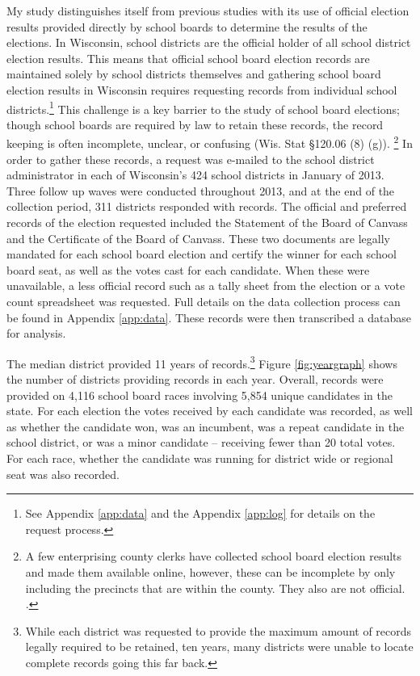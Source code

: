 My study distinguishes itself from previous studies with 
its use of official election results provided directly by school boards to determine 
the results of the elections. In Wisconsin, school districts are the official holder of all school district election results. This means that official school board election records are maintained solely by 
school districts themselves and gathering school board election results in Wisconsin 
requires requesting records from individual school districts.\footnote{See Appendix 
\ref{app:data} and the Appendix \ref{app:log} for details on the request process.} 
This challenge is a key barrier to the study of school board elections; though 
school boards are required by law to retain these records, the record keeping is 
often incomplete, unclear, or confusing (Wis. Stat \S 120.06 (8) (g)).
\footnote{A few enterprising county clerks have collected school board election 
results and made them available online, however, these can be incomplete 
by only including the precincts that are within the county. They also are not official. 
\citep[personal communication with][]{clerk1}.} In order to gather these records, a 
request was e-mailed to the school district administrator in each of Wisconsin's 
424 school districts in January of 2013. Three follow up waves were conducted throughout 
2013, and at the end of the collection period, 311 
districts responded with records. The official and preferred 
records of the election requested included the Statement of the Board of Canvass 
and the Certificate of the Board of Canvass. These two documents are legally mandated 
for each school board election and certify the winner for each school board seat, 
as well as the votes cast for each candidate. When these were unavailable, a less 
official record such as a tally sheet from the election or a vote count spreadsheet 
was requested. Full details on the data collection process can be found in Appendix \ref{app:data}. 
These records were then transcribed a database for analysis.

The median district provided 
11 
years of records.\footnote{While each district was requested to provide the maximum amount of records legally required to be retained, ten years, many districts were unable to locate complete 
records going this far back.} Figure \ref{fig:yeargraph} shows the number of districts providing 
records in each year. Overall, records were provided on 4,116 school 
board races involving 5,854 unique candidates in the state. 
For each election the votes received by each candidate was recorded, as well as 
whether the candidate won, was an incumbent, was a repeat candidate in the school 
district, or was a minor candidate -- receiving fewer than 20 total votes. For each 
race, whether the candidate was running for district wide or regional seat was 
also recorded. 

